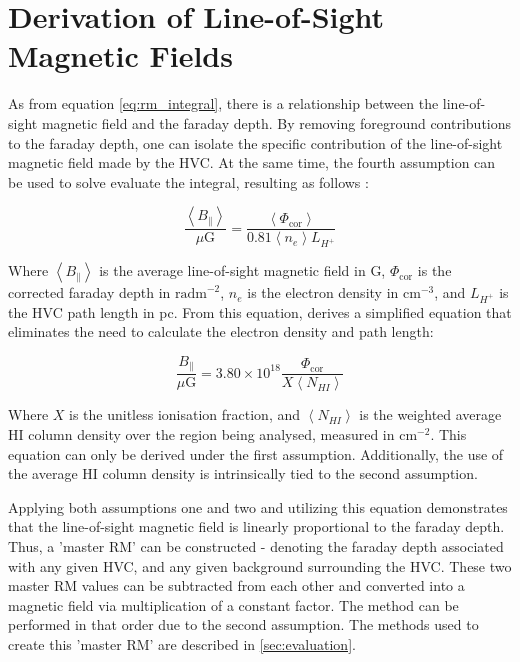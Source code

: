 \section{Derivation of Line-of-Sight Magnetic Fields}
\label{sec:los_dev}

As from equation \ref{eq:rm_integral}, there is a relationship between the line-of-sight magnetic field and the faraday depth. By removing foreground contributions to the faraday depth, one can isolate the specific contribution of the line-of-sight magnetic field made by the HVC. At the same time, the fourth assumption can be used to solve evaluate the integral, resulting as follows \citep{ID26}:


\begin{equation}
    \frac{\left<B_{\parallel}\right>}{\mu\mathrm{G}}=\frac{\left<\Phi_{\mathrm{cor}}\right>}{0.81\left<n_e\right>L_{H^+}}
\label{eq:B_intermediate}
\end{equation}


Where $\left<B_{\parallel}\right>$ is the average line-of-sight magnetic field in \textmu G, $\Phi_{\mathrm{cor}}$ is the corrected faraday depth in $\mathrm{rad m}^{-2}$, $n_e$ is the electron density in $\mathrm{cm}^{-3}$, and $L_{H^+}$ is the HVC path length in pc. From this equation, \cite{ID27} derives a simplified equation that eliminates the need to calculate the electron density and path length:


\begin{equation}
    \frac{B_{\parallel}}{\mu\mathrm{G}}=3.80\times10^{18}\frac{\Phi_{\mathrm{cor}}}{X\left<N_{HI}\right>}
\label{eq:the_equation}
\end{equation}


Where $X$ is the unitless ionisation fraction, and $\left<N_{HI}\right>$ is the weighted average HI column density over the region being analysed, measured in $\mathrm{cm}^{-2}$. This equation can only be derived under the first assumption. Additionally, the use of the average HI column density is intrinsically tied to the second assumption.


Applying both assumptions one and two and utilizing this equation demonstrates that the line-of-sight magnetic field is linearly proportional to the faraday depth. Thus, a 'master RM'  can be constructed - denoting the faraday depth associated with any given HVC, and any given background surrounding the HVC. These two master RM values can be subtracted from each other and converted into a magnetic field via multiplication of a constant factor. The method can be performed in that order due to the second assumption. The methods used to create this 'master RM' are described in \ref{sec:evaluation}.


